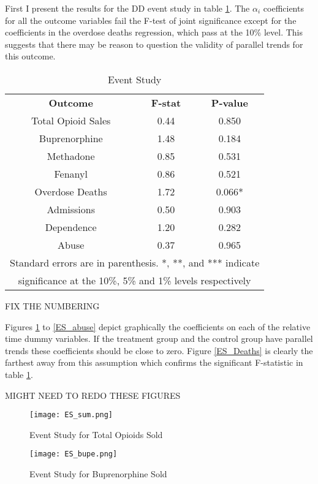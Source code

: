 \documentclass[11pt]{article}
\begin{document}
First I present the results for the DD event study in table \ref{DD Event Study}.  The $\alpha_i$ coefficients for all the outcome variables fail the F-test of joint significance except for the coefficients in the overdose deaths regression, which pass at the 10\% level.  This suggests that there may be reason to question the validity of parallel trends for this outcome.   

\begin{table}[htb]
\centering
\scriptsize
\caption{Event Study} 
\label{DD Event Study}
\begin{tabular}{ccc}
\hline \hline
 \textbf{Outcome} & \textbf{F-stat} & \textbf{P-value} \\
Total Opioid Sales &0.44 & 0.850 \\
Buprenorphine & 1.48 & 0.184 \\
Methadone &0.85 & 0.531\\
Fenanyl  &0.86 & 0.521 \\
Overdose Deaths  &1.72 & 0.066*\\
Admissions  &0.50 & 0.903 \\
Dependence  &1.20 & 0.282 \\
Abuse  &0.37 & 0.965\\
\hline
\multicolumn{3}{c}{\tiny{Standard errors are in parenthesis.  *, **, and *** indicate }} \\
\multicolumn{3}{c}{\tiny{significance at the 10\%, 5\% and 1\% levels respectively}} \\
\hline
\end{tabular}
\end{table}

FIX THE NUMBERING 


Figures \ref{ES_Total Opioids Sold} to \ref{ES_abuse} depict graphically the coefficients on each of the relative time dummy variables.  If the treatment group and the control group have parallel trends these coefficients should be close to zero.  Figure \ref{ES_Deaths} is clearly the farthest away from this assumption which confirms the significant F-statistic in table \ref{DD Event Study}. 

MIGHT NEED TO REDO THESE FIGURES

\begin{figure}[htb] 
  \texttt{[image: ES\_sum.png]}
  \caption{Event Study for Total Opioids Sold}
  \label{ES_Total Opioids Sold}
\end{figure}

\begin{figure} 
  \texttt{[image: ES\_bupe.png]}
  \caption{Event Study for Buprenorphine Sold}
  \label{ES_Buprenorphine}
\end{figure}
\end{document}

